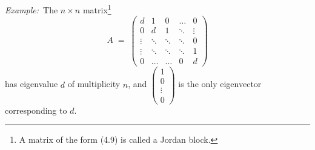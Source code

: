 %

\par\medskip\noindent\textit{Example:}\ The $n \times n$ matrix\footnote{A matrix of
the form (4.9) is called a Jordan block.}
\begin{equation}
A \;=\; \begin{pmatrix}
d & 1 & 0 & \dots & 0\\
0 & d & 1 & \ddots & \vdots\\
\vdots & \ddots & \ddots & \ddots & 0\\
\vdots & \ddots & \ddots & \ddots & 1\\
0 & \dots & \dots & 0 & d
\end{pmatrix}
\end{equation}
has eigenvalue $d$ of multiplicity $n$, and $\begin{pmatrix}1\\0\\\vdots\\0\end{pmatrix}$
is the only eigenvector corresponding to $d$.

